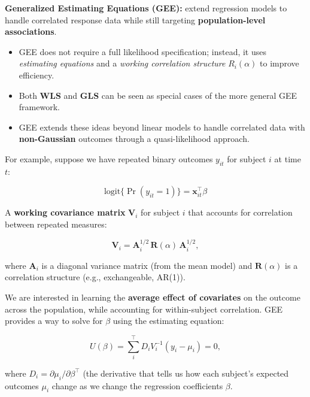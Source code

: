 \documentclass[
  letterpaper,
  DIV=11,
  numbers=noendperiod]{scrreprt}
\begin{document}
\begin{tcolorbox}[enhanced jigsaw, breakable, colbacktitle=quarto-callout-important-color!10!white, left=2mm, colframe=quarto-callout-important-color-frame, opacityback=0, coltitle=black, colback=white, rightrule=.15mm, title=\textcolor{quarto-callout-important-color}{\faExclamation}\hspace{0.5em}{Important}, titlerule=0mm, opacitybacktitle=0.6, leftrule=.75mm, toprule=.15mm, arc=.35mm, bottomtitle=1mm, toptitle=1mm, bottomrule=.15mm]

\textbf{Generalized Estimating Equations (GEE):} extend regression
models to handle correlated response data while still targeting
\textbf{population-level associations}.

\begin{itemize}
\item
  GEE does not require a full likelihood specification; instead, it uses
  \emph{estimating equations} and a \emph{working correlation structure}
  \(R_i(\alpha)\) to improve efficiency.
\item
  Both \textbf{WLS} and \textbf{GLS} can be seen as special cases of the
  more general GEE framework.
\item
  GEE extends these ideas beyond linear models to handle correlated data
  with \textbf{non-Gaussian} outcomes through a quasi-likelihood
  approach.
\end{itemize}

For example, suppose we have repeated binary outcomes \(y_{it}\) for
subject \(i\) at time \(t\):

\[
\text{logit}\{\Pr(y_{it}=1)\} = \mathbf{x}_{it}^\top \beta
\]

A \textbf{working covariance matrix} \(\mathbf{V}_i\) for subject \(i\)
that accounts for correlation between repeated measures:

\[
\mathbf{V}_i = \mathbf{A}_i^{1/2}\,\mathbf{R}(\alpha)\,\mathbf{A}_i^{1/2},
\]

where \(\mathbf{A}_i\) is a diagonal variance matrix (from the mean
model) and \(\mathbf{R}(\alpha)\) is a correlation structure (e.g.,
exchangeable, AR(1)).

We are interested in learning the \textbf{average effect of covariates}
on the outcome across the population, while accounting for
within-subject correlation. GEE provides a way to solve for \(\beta\)
using the estimating equation:

\[
U(\beta) = \sum_i^\top D_i V_i^{-1}(y_i - \mu_i) = 0,
\]

where \(D_i = \partial \mu_i/\partial \beta^\top\) (the derivative that
tells us how each subject's expected outcomes \(\mu_i\) change as we
change the regression coefficients \(\beta\).

\end{tcolorbox}
\end{document}
